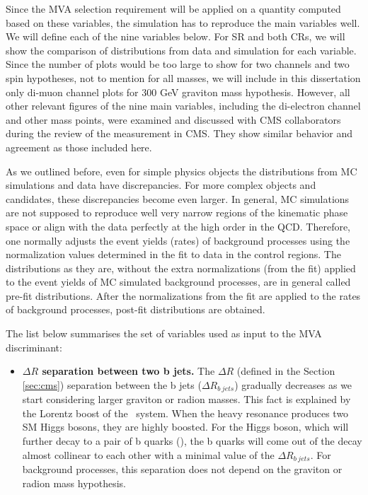 \begin{small}
Since the MVA selection requirement will be applied on a quantity computed based on these variables, the simulation has to reproduce the main variables well. We will define each of the nine variables below. For SR and both CRs, we will show the comparison of distributions from data and simulation for each variable. Since the number of plots would be too large to show for two channels and two spin hypotheses, not to mention for all masses, we will include in this dissertation only di-muon channel plots for 300 GeV graviton mass hypothesis. However, all other relevant figures of the nine main variables, including the di-electron channel and other mass points,  were examined and discussed with CMS collaborators during the review of the measurement in CMS. They show similar behavior and agreement as those included here.
           
As we outlined before, even for simple physics objects the distributions from MC simulations and data have discrepancies. For more complex objects and candidates, these discrepancies become even larger. In general, MC simulations are not supposed to reproduce well very narrow regions of the kinematic phase space or align with the data perfectly at the high order in the QCD. Therefore, one normally adjusts the event yields (rates) of background processes using the normalization values determined in the fit to data in the control regions. The distributions as they are, without the extra normalizations (from the fit) applied to the event yields of MC simulated background processes, are in general called pre-fit distributions. After the normalizations from the fit are applied to the rates of background processes, post-fit distributions are obtained. 

The list below summarises the set of variables used as input to the MVA discriminant:

\begin{itemize}

\item{\bfseries $\Delta R$ separation between two b jets.}
The $\Delta R$ (defined in the Section \ref{sec:cms}) separation between the b jets ($\Delta R_{b\ jets}$) gradually decreases as we start considering larger graviton or radion masses. This fact is explained by the Lorentz boost of the \HBB~system. When the heavy resonance produces two SM Higgs bosons, they are highly boosted. For the Higgs boson, which will further decay to a pair of b quarks (\HBB), the b quarks will come out of the decay almost collinear to each other with a minimal value of the $\Delta R_{b\ jets}$. For background processes, this separation does not depend on the graviton or radion mass hypothesis. 


\end{itemize}
\end{small}
